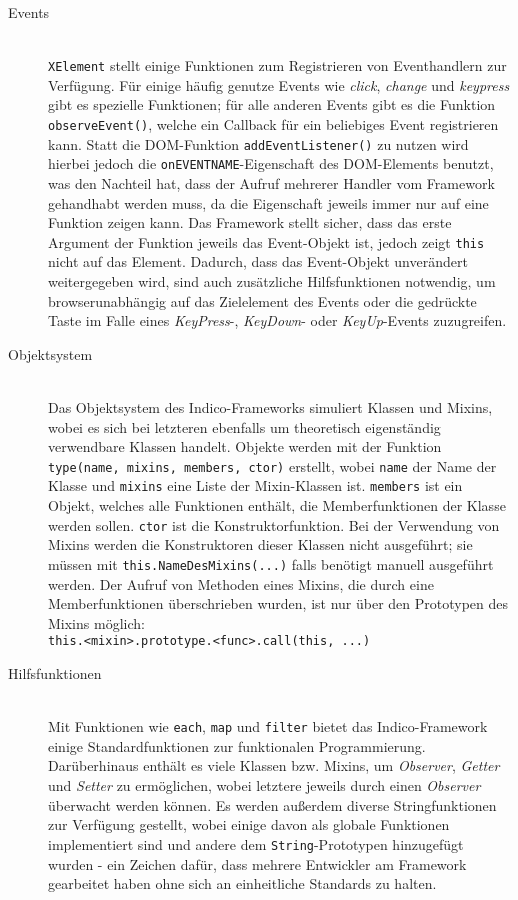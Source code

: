 \begin{description}
\item[Events] \hfill \\
\lstinline{XElement} stellt einige Funktionen zum Registrieren von Eventhandlern zur Verfügung. Für
einige häufig genutze Events wie \emph{click}, \emph{change} und \emph{keypress} gibt es spezielle
Funktionen; für alle anderen Events gibt es die Funktion \lstinline{observeEvent()}, welche ein
Callback für ein beliebiges Event registrieren kann. Statt die DOM-Funktion
\lstinline{addEventListener()} zu nutzen wird hierbei jedoch die \lstinline{onEVENTNAME}-Eigenschaft
des DOM-Elements benutzt, was den Nachteil hat, dass der Aufruf mehrerer Handler vom Framework
gehandhabt werden muss, da die Eigenschaft jeweils immer nur auf eine Funktion zeigen kann. Das
Framework stellt sicher, dass das erste Argument der Funktion jeweils das Event-Objekt ist, jedoch
zeigt \lstinline{this} nicht auf das Element. Dadurch, dass das Event-Objekt unverändert
weitergegeben wird, sind auch zusätzliche Hilfsfunktionen notwendig, um browserunabhängig auf das
Zielelement des Events oder die gedrückte Taste im Falle eines \emph{KeyPress}-, \emph{KeyDown}-
oder \emph{KeyUp}-Events zuzugreifen.

\item[Objektsystem] \hfill \\
Das Objektsystem des Indico-Frameworks simuliert Klassen und Mixins, wobei es sich bei letzteren
ebenfalls um theoretisch eigenständig verwendbare Klassen handelt. Objekte werden mit der Funktion
\lstinline{type(name, mixins, members, ctor)} erstellt, wobei \lstinline{name} der Name der Klasse
und \lstinline{mixins} eine Liste der Mixin-Klassen ist. \lstinline{members} ist ein Objekt, welches
alle Funktionen enthält, die Memberfunktionen der Klasse werden sollen. \lstinline{ctor} ist die
Konstruktorfunktion. Bei der Verwendung von Mixins werden die Konstruktoren dieser Klassen nicht
ausgeführt; sie müssen mit \lstinline{this.NameDesMixins(...)} falls benötigt manuell ausgeführt
werden. Der Aufruf von Methoden eines Mixins, die durch eine Memberfunktionen überschrieben wurden,
ist nur über den Prototypen des Mixins möglich: \\
\lstinline{this.<mixin>.prototype.<func>.call(this, ...)}

\item[Hilfsfunktionen] \hfill \\
Mit Funktionen wie \lstinline{each}, \lstinline{map} und \lstinline{filter} bietet das
Indico-Framework einige Standardfunktionen zur funktionalen Programmierung. Darüberhinaus enthält es
viele Klassen bzw. Mixins, um \emph{Observer}, \emph{Getter} und \emph{Setter} zu ermöglichen, wobei
letztere jeweils durch einen \emph{Observer} überwacht werden können. Es werden außerdem diverse
Stringfunktionen zur Verfügung gestellt, wobei einige davon als globale Funktionen implementiert
sind und andere dem \lstinline{String}-Prototypen hinzugefügt wurden - ein Zeichen dafür, dass
mehrere Entwickler am Framework gearbeitet haben ohne sich an einheitliche Standards zu halten.


\end{description}
